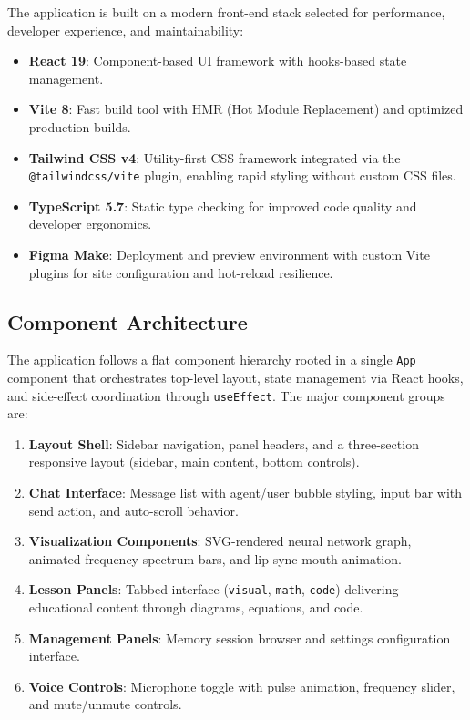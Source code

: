 \documentclass[11pt,a4paper]{article}
\begin{document}
The application is built on a modern front-end stack selected for performance, developer experience, and maintainability:

\begin{itemize}
  \item \textbf{React 19}: Component-based UI framework with hooks-based state management.
  \item \textbf{Vite 8}: Fast build tool with HMR (Hot Module Replacement) and optimized production builds.
  \item \textbf{Tailwind CSS v4}: Utility-first CSS framework integrated via the \texttt{@tailwindcss/vite} plugin, enabling rapid styling without custom CSS files.
  \item \textbf{TypeScript 5.7}: Static type checking for improved code quality and developer ergonomics.
  \item \textbf{Figma Make}: Deployment and preview environment with custom Vite plugins for site configuration and hot-reload resilience.
\end{itemize}

\subsection{Component Architecture}

The application follows a flat component hierarchy rooted in a single \texttt{App} component that orchestrates top-level layout, state management via React hooks, and side-effect coordination through \texttt{useEffect}. The major component groups are:

\begin{enumerate}
  \item \textbf{Layout Shell}: Sidebar navigation, panel headers, and a three-section responsive layout (sidebar, main content, bottom controls).
  \item \textbf{Chat Interface}: Message list with agent/user bubble styling, input bar with send action, and auto-scroll behavior.
  \item \textbf{Visualization Components}: SVG-rendered neural network graph, animated frequency spectrum bars, and lip-sync mouth animation.
  \item \textbf{Lesson Panels}: Tabbed interface (\texttt{visual}, \texttt{math}, \texttt{code}) delivering educational content through diagrams, equations, and code.
  \item \textbf{Management Panels}: Memory session browser and settings configuration interface.
  \item \textbf{Voice Controls}: Microphone toggle with pulse animation, frequency slider, and mute/unmute controls.
\end{enumerate}
\end{document}
